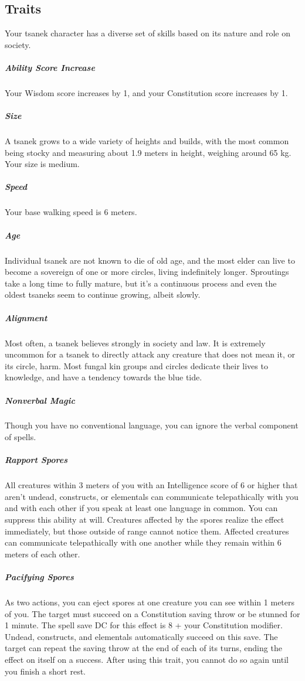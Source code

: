 \subsection*{Traits}
    Your tsanek character has a diverse set of skills based on its nature and role on society.

    \subparagraph{Ability Score Increase} Your Wisdom score increases by 1, and your Constitution score increases by 1.

    \subparagraph{Size} A tsanek grows to a wide variety of heights and builds, with the most common being stocky and measuring about 1.9 meters in height, weighing around 65 kg.
    Your size is medium.

    \subparagraph{Speed} Your base walking speed is 6 meters.

    \subparagraph{Age} Individual tsanek are not known to die of old age, and the most elder can live to become a sovereign of one or more circles, living indefinitely longer.
    Sproutings take a long time to fully mature, but it's a continuous process and even the oldest tsaneks seem to continue growing, albeit slowly.

    \subparagraph{Alignment} Most often, a tsanek believes strongly in society and law.
    It is extremely uncommon for a tsanek to directly attack any creature that does not mean it, or its circle, harm.
    Most fungal kin groups and circles dedicate their lives to knowledge, and have a tendency towards the blue tide.

    \subparagraph{Nonverbal Magic} Though you have no conventional language, you can ignore the verbal component of spells.

    \subparagraph{Rapport Spores} All creatures within 3 meters of you with an Intelligence score of 6 or higher that aren't undead, constructs, or elementals can communicate telepathically with you and with each other if you speak at least one language in common.
    You can suppress this ability at will.
    Creatures affected by the spores realize the effect immediately, but those outside of range cannot notice them.
    Affected creatures can communicate telepathically with one another while they remain within 6 meters of each other.

    \subparagraph{Pacifying Spores} \label{kin::tsanek.pacifyingspores}
    As two actions, you can eject spores at one creature you can see within 1 meters of you.
    The target must succeed on a Constitution saving throw or be stunned for 1 minute.
    The spell save DC for this effect is 8 + your Constitution modifier.
    Undead, constructs, and elementals automatically succeed on this save.
    The target can repeat the saving throw at the end of each of its turns, ending the effect on itself on a success.
    After using this trait, you cannot do so again until you finish a short rest.

